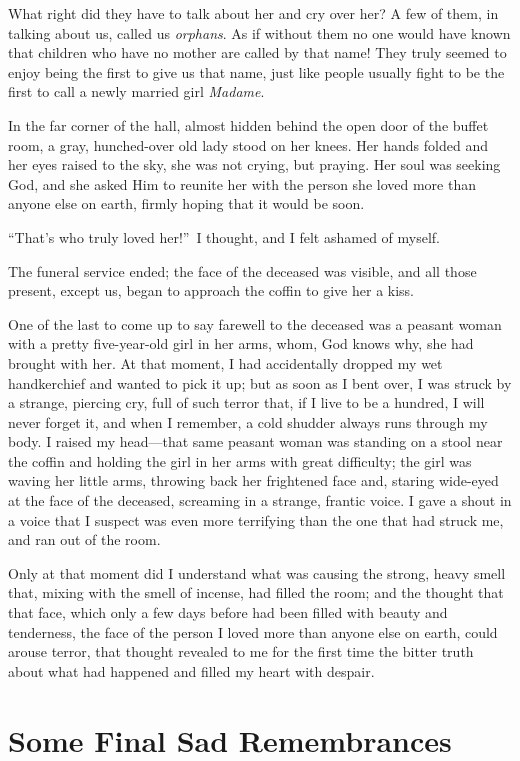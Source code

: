 What right did they have to talk about her and cry over her? A few of them, in talking about us, called us \textit{orphans}. As if without them no one would have known that children who have no mother are called by that name! They truly seemed to enjoy being the first to give us that name, just like people usually fight to be the first to call a newly married girl \textit{Madame}. 

In the far corner of the hall, almost hidden behind the open door of the buffet room, a gray, hunched-over old lady stood on her knees. Her hands folded and her eyes raised to the sky, she was not crying, but praying. Her soul was seeking God, and she asked Him to reunite her with the person she loved more than anyone else on earth, firmly hoping that it would be soon.

``That's who truly loved her!''~I thought, and I felt ashamed of myself. %

The funeral service ended; the face of the deceased was visible, and all those present, except us, began to approach the coffin to give her a kiss.

One of the last to come up to say farewell to the deceased was a peasant woman with a pretty five-year-old girl in her arms, whom, God knows why, she had brought with her. At that moment, I had accidentally dropped my wet handkerchief and wanted to pick it up; but as soon as I bent over, I was struck by a strange, piercing cry, full of such terror that, if I live to be a hundred, I will never forget it, and when I remember, a cold shudder always runs through my body. I raised my head---that same peasant woman was standing on a stool near the coffin and holding the girl in her arms with great difficulty; the girl was waving her little arms, throwing back her frightened face and, staring wide-eyed at the face of the deceased, screaming in a strange, frantic voice. I gave a shout in a voice that I suspect was even more terrifying than the one that had struck me, and ran out of the room.

Only at that moment did I understand what was causing the strong, heavy smell that, mixing with the smell of incense, had filled the room; and the thought that that face, which only a few days before had been filled with beauty and tenderness, the face of the person I loved more than anyone else on earth, could arouse terror, that thought revealed to me for the first time the bitter truth about what had happened and filled my heart with despair.

\chapter{Some Final Sad Remembrances} %

